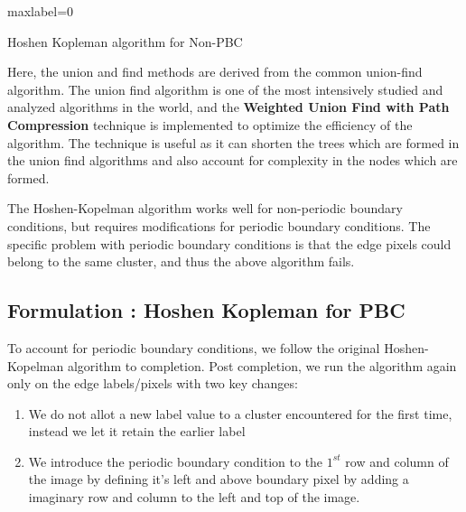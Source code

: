 \documentclass[12pt, a4paper]{report}
\begin{document}
\begin{algorithm}[H]
\SetAlgoLined
{}
 maxlabel=0\;
 \caption{Hoshen Kopleman algorithm for Non-PBC}
\end{algorithm}

Here, the union and find methods are derived from the common union-find algorithm. The union find algorithm is one of the most intensively studied and analyzed algorithms in the world, and the \textbf{Weighted Union Find with Path Compression} technique is implemented to optimize the efficiency of the algorithm. The technique is useful as it can shorten the trees which are formed in the union find algorithms and also account for complexity in the nodes which are formed.

The Hoshen-Kopelman algorithm works well for non-periodic boundary conditions, but requires modifications for periodic boundary conditions. The specific problem with periodic boundary conditions is that the edge pixels could belong to the same cluster, and thus the above algorithm fails.

\subsection{Formulation : Hoshen Kopleman for PBC}
To account for periodic boundary conditions, we follow the original Hoshen-Kopelman algorithm to completion. Post completion, we run the algorithm again only on the edge labels/pixels with two key changes:

\begin{enumerate}
    \item We do not allot a new label value to a cluster encountered for the first time, instead we let it retain the earlier label
    \item We introduce the periodic boundary condition to the $1^{st}$ row and column of the image by defining it's left and above boundary pixel by adding a imaginary row and column to the left and top of the image. 
\end{enumerate}
\end{document}
